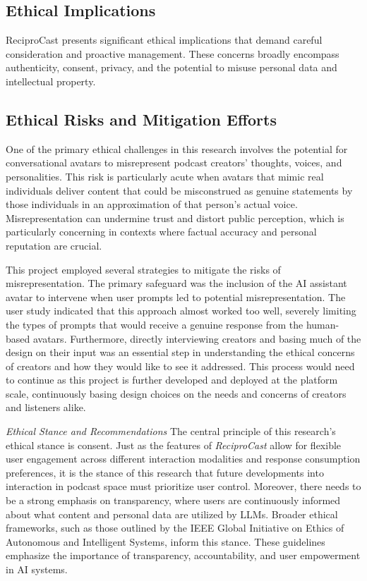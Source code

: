 \documentclass[12pt]{report}
\begin{document}
\begin{myfont}
        \section{Ethical Implications}
        ReciproCast presents significant ethical implications that demand careful consideration and proactive management. These concerns broadly encompass authenticity, consent, privacy, and the potential to misuse personal data and intellectual property.
        
        \subsection{Ethical Risks and Mitigation Efforts}
        One of the primary ethical challenges in this research involves the potential for conversational avatars to misrepresent podcast creators' thoughts, voices, and personalities. This risk is particularly acute when avatars that mimic real individuals deliver content that could be misconstrued as genuine statements by those individuals in an approximation of that person's actual voice. Misrepresentation can undermine trust and distort public perception, which is particularly concerning in contexts where factual accuracy and personal reputation are crucial.
        
        \indent This project employed several strategies to mitigate the risks of misrepresentation. The primary safeguard was the inclusion of the AI assistant avatar to intervene when user prompts led to potential misrepresentation. The user study indicated that this approach almost worked too well, severely limiting the types of prompts that would receive a genuine response from the human-based avatars. Furthermore, directly interviewing creators and basing much of the design on their input was an essential step in understanding the ethical concerns of creators and how they would like to see it addressed. This process would need to continue as this project is further developed and deployed at the platform scale, continuously basing design choices on the needs and concerns of creators and listeners alike.
        
        \textit{Ethical Stance and Recommendations}
        The central principle of this research's ethical stance is consent. Just as the features of \textit{ReciproCast} allow for flexible user engagement across different interaction modalities and response consumption preferences, it is the stance of this research that future developments into interaction in podcast space must prioritize user control. Moreover, there needs to be a strong emphasis on transparency, where users are continuously informed about what content and personal data are utilized by LLMs. Broader ethical frameworks, such as those outlined by the IEEE Global Initiative on Ethics of Autonomous and Intelligent Systems, inform this stance\citep{chatila2019ieee}. These guidelines emphasize the importance of transparency, accountability, and user empowerment in AI systems.


\end{myfont}
\end{document}
